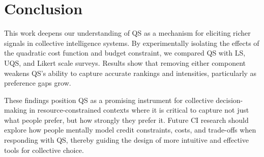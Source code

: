 \section{Conclusion}
This work deepens our understanding of QS as a mechanism for eliciting richer signals in collective intelligence systems. By experimentally isolating the effects of the quadratic cost function and budget constraint, we compared QS with LS, UQS, and Likert scale surveys. Results show that removing either component weakens QS’s ability to capture accurate rankings and intensities, particularly as preference gaps grow.

These findings position QS as a promising instrument for collective decision-making in resource-constrained contexts where it is critical to capture not just what people prefer, but how strongly they prefer it. Future CI research should explore how people mentally model credit constraints, costs, and trade-offs when responding with QS, thereby guiding the design of more intuitive and effective tools for collective choice.

